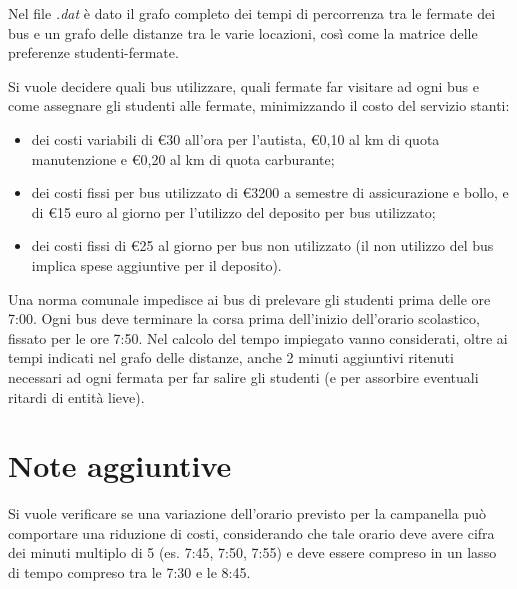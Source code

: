 Nel file \textit{.dat} è dato il grafo completo dei tempi di percorrenza tra le fermate dei bus e un grafo delle distanze tra le varie locazioni, così come la matrice delle preferenze studenti-fermate.

 Si vuole decidere quali bus utilizzare, quali fermate far visitare ad ogni bus e come assegnare gli studenti alle fermate, minimizzando il costo del servizio stanti:

\begin{itemize}
 \item dei costi variabili di €30 all'ora per l'autista, €0,10 al km di quota manutenzione e €0,20 al km di quota carburante;
 \item dei costi fissi per bus utilizzato di €3200 a semestre di assicurazione e bollo, e di €15 euro al giorno per l'utilizzo del deposito per bus utilizzato;
 \item dei costi fissi di €25 al giorno per bus non utilizzato (il non utilizzo del bus implica spese aggiuntive per il deposito).
\end{itemize}
 Una norma comunale impedisce ai bus di prelevare gli studenti prima delle ore 7:00. Ogni bus deve terminare la corsa prima dell'inizio dell'orario scolastico, fissato per le ore 7:50. Nel calcolo del tempo impiegato vanno considerati, oltre ai tempi indicati nel grafo delle distanze, anche 2 minuti aggiuntivi ritenuti necessari ad ogni fermata per far salire gli studenti (e per assorbire eventuali ritardi di entità lieve).

\section{Note aggiuntive}
 Si vuole verificare se una variazione dell'orario previsto per la campanella può comportare una riduzione di costi, considerando che tale orario deve avere cifra dei minuti multiplo di 5 (es. 7:45, 7:50, 7:55) e deve essere compreso in un lasso di tempo compreso tra le 7:30 e le 8:45.
